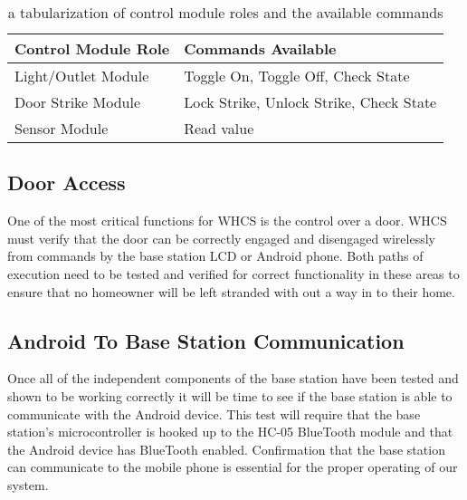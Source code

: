 \begin{table}[H]
\centering
\begin{tabular}{|l|l|}
\hline
{\color{black} Control Module Role} &
{\color{black} Commands Available}\\\hline
{\color{black} Light/Outlet Module} &
{\color{black} Toggle On},
{\color{black} Toggle Off},
{\color{black} Check State}
\\\hline
{\color{black} Door Strike Module} &
{\color{black} Lock Strike},
{\color{black} Unlock Strike},
{\color{black} Check State}
\\\hline
{\color{black} Sensor Module} &
{\color{black} Read value}
\\\hline
\end{tabular}
\caption{a tabularization of control module roles and the available commands}
\label{tab:ctrl-mod-role}
\end{table}

\subsection{Door Access}
One of the most critical functions for WHCS is the control over a door.
WHCS must verify that the door can be correctly engaged and disengaged
wirelessly from commands by the base station LCD or Android phone. Both paths
of execution need to be tested and verified for correct functionality in these
areas to ensure that no homeowner will be left stranded with out a way in to
their home.

\subsection{Android To Base Station Communication}
Once all of the independent components of the base station have been tested and
shown to be working correctly it will be time to see if the base station is
able to communicate with the Android device. This test will require that the
base station{}'s microcontroller is hooked up to the HC{}-05 BlueTooth module
and that the Android device has BlueTooth enabled. Confirmation that the base
station can communicate to the mobile phone is essential for the proper
operating of our system.

